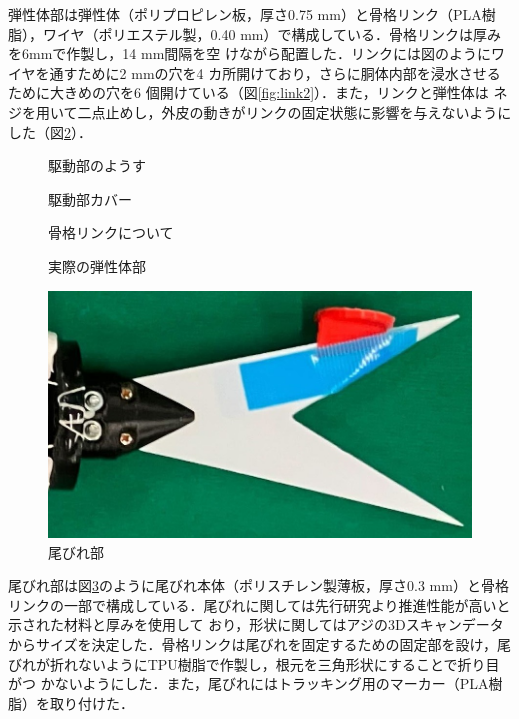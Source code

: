 弾性体部は弾性体（ポリプロピレン板，厚さ0.75 mm）と骨格リンク（PLA樹脂），ワイヤ（ポリエステル製，0.40 mm）で構成している．骨格リンクは厚みを6mmで作製し，14 mm間隔を空
けながら配置した．リンクには図のようにワイヤを通すために2 mmの穴を4 カ所開けており，さらに胴体内部を浸水させるために大きめの穴を6 個開けている（図\ref{fig:link2}）．また，リンクと弾性体は
ネジを用いて二点止めし，外皮の動きがリンクの固定状態に影響を与えないようにした（図\ref{fig:real_link}）．
\begin{figure}[t]
    \centering
    \begin{minipage}[b]{0.35\linewidth}
        \centering
        \caption{駆動部のようす}
        \label{fig:kudou}
    \end{minipage}
    \hspace{0.1\linewidth}
    \begin{minipage}[b]{0.35\linewidth}
        \centering
        \caption{駆動部カバー}
        \label{fig:cover}
    \end{minipage}
\end{figure}
\begin{figure}[t]
    \centering
    \begin{minipage}[b]{0.35\linewidth}
        \centering
        \caption{骨格リンクについて}
        \label{fig:link2}
    \end{minipage}
    \hspace{0.1\linewidth}
    \begin{minipage}[b]{0.35\linewidth}
        \centering
        \caption{実際の弾性体部}
        \label{fig:real_link}
    \end{minipage}
\end{figure}
\begin{figure}[t]
    \centering
    \includegraphics[width=0.5\linewidth]{chapters/picture/obire.jpg}
    \caption{尾びれ部}
    \label{fig:obire}
\end{figure}
尾びれ部は図\ref{fig:obire}のように尾びれ本体（ポリスチレン製薄板，厚さ0.3 mm）と骨格リンクの一部で構成している．尾びれに関しては先行研究\cite{ni}より推進性能が高いと示された材料と厚みを使用して
おり，形状に関してはアジの3Dスキャンデータからサイズを決定した．骨格リンクは尾びれを固定するための固定部を設け，尾びれが折れないようにTPU樹脂で作製し，根元を三角形状にすることで折り目がつ
かないようにした．また，尾びれにはトラッキング用のマーカー（PLA樹脂）を取り付けた．

